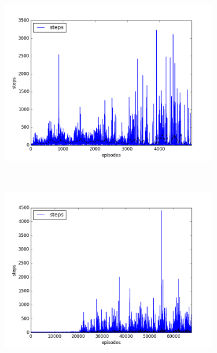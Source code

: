 \begin{figure}[t]
  \vspace*{-2cm}
  \begin{subfigure}[t]{\figscale\linewidth}
    \hspace*{-2.75cm}
    \includegraphics[width=1.5\textwidth]
    {../results/dqn_1vs1/steps.png}
    \label{fig:dqn-1vs1-steps}
  \end{subfigure}
  ~
  \begin{subfigure}[t]{\figscale\linewidth}
    \hspace*{-1.4cm}
    \includegraphics[width=1.5\textwidth]
    {../results/ddpg_1vs1/steps.png}
    \label{fig:ddpg-1vs1-steps}
  \end{subfigure}

\end{figure}
